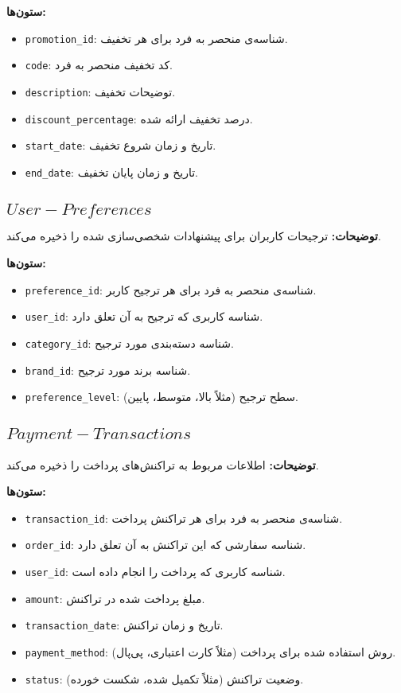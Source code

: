 \documentclass[12pt]{article}
\begin{document}
\textbf{ستون‌ها:}
\begin{itemize}
    \item \texttt{promotion\_id}: شناسه‌ی منحصر به فرد برای هر تخفیف.
    \item \texttt{code}: کد تخفیف منحصر به فرد.
    \item \texttt{description}: توضیحات تخفیف.
    \item \texttt{discount\_percentage}: درصد تخفیف ارائه شده.
    \item \texttt{start\_date}: تاریخ و زمان شروع تخفیف.
    \item \texttt{end\_date}: تاریخ و زمان پایان تخفیف.
\end{itemize}

\subsection{\(User-Preferences\)}

\textbf{توضیحات:} ترجیحات کاربران برای پیشنهادات شخصی‌سازی شده را ذخیره می‌کند.

\textbf{ستون‌ها:}
\begin{itemize}
    \item \texttt{preference\_id}: شناسه‌ی منحصر به فرد برای هر ترجیح کاربر.
    \item \texttt{user\_id}: شناسه کاربری که ترجیح به آن تعلق دارد.
    \item \texttt{category\_id}: شناسه دسته‌بندی مورد ترجیح.
    \item \texttt{brand\_id}: شناسه برند مورد ترجیح.
    \item \texttt{preference\_level}: سطح ترجیح (مثلاً بالا، متوسط، پایین).
\end{itemize}

\subsection{\(Payment-Transactions\)}

\textbf{توضیحات:} اطلاعات مربوط به تراکنش‌های پرداخت را ذخیره می‌کند.

\textbf{ستون‌ها:}
\begin{itemize}
    \item \texttt{transaction\_id}: شناسه‌ی منحصر به فرد برای هر تراکنش پرداخت.
    \item \texttt{order\_id}: شناسه سفارشی که این تراکنش به آن تعلق دارد.
    \item \texttt{user\_id}: شناسه کاربری که پرداخت را انجام داده است.
    \item \texttt{amount}: مبلغ پرداخت شده در تراکنش.
    \item \texttt{transaction\_date}: تاریخ و زمان تراکنش.
    \item \texttt{payment\_method}: روش استفاده شده برای پرداخت (مثلاً کارت اعتباری، پی‌پال).
    \item \texttt{status}: وضعیت تراکنش (مثلاً تکمیل شده، شکست خورده).
\end{itemize}
\end{document}
